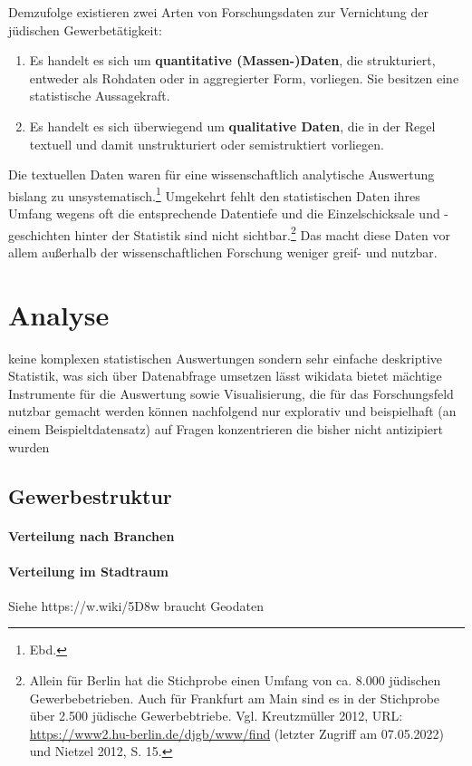 Demzufolge existieren zwei Arten von Forschungsdaten zur Vernichtung der jüdischen Gewerbetätigkeit:

\begin{enumerate}
    \item Es handelt es sich um \textbf{quantitative (Massen-)Daten}, die strukturiert, entweder als Rohdaten oder in aggregierter Form, vorliegen. Sie besitzen eine statistische Aussagekraft.
    \item Es handelt es sich überwiegend um \textbf{qualitative Daten}, die in der Regel textuell und damit unstrukturiert oder semistruktiert vorliegen.
\end{enumerate}

Die textuellen Daten waren für eine wissenschaftlich analytische Auswertung bislang zu unsystematisch.\footnote{Ebd.} Umgekehrt fehlt den statistischen Daten ihres Umfang wegens oft die entsprechende Datentiefe und die Einzelschicksale und -geschichten hinter der Statistik sind nicht sichtbar.\footnote{Allein für Berlin hat die Stichprobe einen Umfang von ca. 8.000 jüdischen Gewerbebetrieben. Auch für Frankfurt am Main sind es in der Stichprobe über 2.500 jüdische Gewerbebtriebe. Vgl. Kreutzmüller 2012, URL: \url{https://www2.hu-berlin.de/djgb/www/find} (letzter Zugriff am 07.05.2022) und Nietzel 2012, S. 15.} Das macht diese Daten vor allem außerhalb der wissenschaftlichen Forschung weniger greif- und nutzbar. 

\section{Analyse}
keine komplexen statistischen Auswertungen sondern sehr einfache deskriptive Statistik, was sich über Datenabfrage umsetzen lässt
wikidata bietet mächtige Instrumente für die Auswertung sowie Visualisierung, die für das Forschungsfeld nutzbar gemacht werden können
nachfolgend nur explorativ und beispielhaft (an einem Beispieltdatensatz) auf Fragen konzentrieren die bisher nicht antizipiert wurden
\subsection{Gewerbestruktur}
\paragraph{Verteilung nach Branchen}
\paragraph{Verteilung im Stadtraum}
Siehe https://w.wiki/5D8w
braucht Geodaten
